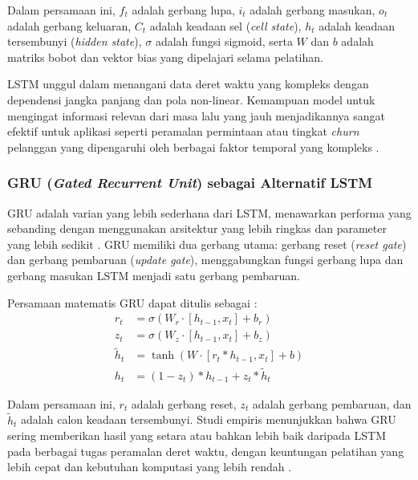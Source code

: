 Dalam persamaan ini, \(f_t\) adalah gerbang lupa, \(i_t\) adalah gerbang masukan, \(o_t\) adalah gerbang keluaran, \(C_t\) adalah keadaan sel (\textit{cell state}), \(h_t\) adalah keadaan tersembunyi (\textit{hidden state}), \(\sigma\) adalah fungsi sigmoid, serta \(W\)\label{sym:W} dan \(b\)\label{sym:b} adalah matriks bobot dan vektor bias yang dipelajari selama pelatihan.

LSTM unggul dalam menangani data deret waktu yang kompleks dengan dependensi jangka panjang dan pola non-linear. Kemampuan model untuk mengingat informasi relevan dari masa lalu yang jauh menjadikannya sangat efektif untuk aplikasi seperti peramalan permintaan atau tingkat \textit{churn} pelanggan yang dipengaruhi oleh berbagai faktor temporal yang kompleks \autocite{Yunita2025NNComparison}.

\subsubsection{GRU (\textit{Gated Recurrent Unit}) sebagai Alternatif LSTM}

GRU adalah varian yang lebih sederhana dari LSTM, menawarkan performa yang sebanding dengan menggunakan arsitektur yang lebih ringkas dan parameter yang lebih sedikit \autocite{Yunita2025NNComparison,Zhang2024ComprehensiveTSFSurvey}. GRU memiliki dua gerbang utama: gerbang reset (\textit{reset gate}) dan gerbang pembaruan (\textit{update gate}), menggabungkan fungsi gerbang lupa dan gerbang masukan LSTM menjadi satu gerbang pembaruan.

Persamaan matematis GRU dapat ditulis sebagai \autocite{Yunita2025NNComparison}:
\label{sym:rt}\label{sym:zt}
\begin{align}
r_t &= \sigma(W_r \cdot [h_{t-1}, x_t] + b_r) \\
z_t &= \sigma(W_z \cdot [h_{t-1}, x_t] + b_z) \\
\tilde{h}_t &= \tanh(W \cdot [r_t * h_{t-1}, x_t] + b) \\
h_t &= (1 - z_t) * h_{t-1} + z_t * \tilde{h}_t
\end{align}

Dalam persamaan ini, \(r_t\) adalah gerbang reset, \(z_t\) adalah gerbang pembaruan, dan \(\tilde{h}_t\) adalah calon keadaan tersembunyi. Studi empiris menunjukkan bahwa GRU sering memberikan hasil yang setara atau bahkan lebih baik daripada LSTM pada berbagai tugas peramalan deret waktu, dengan keuntungan pelatihan yang lebih cepat dan kebutuhan komputasi yang lebih rendah \autocite{Yunita2025NNComparison,Jeaab2024LSTMGRUXGBoost}.

